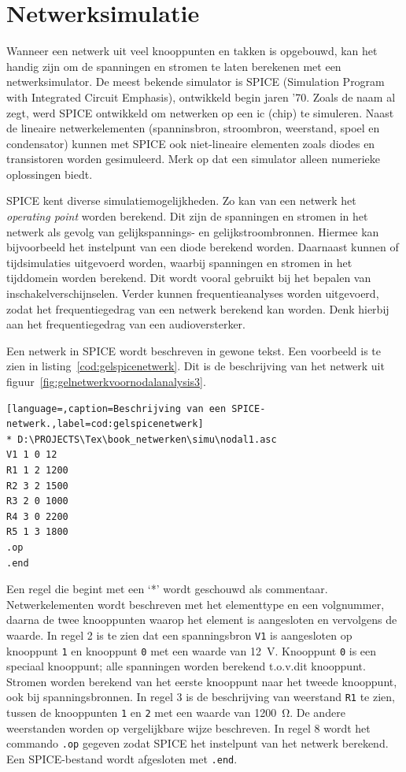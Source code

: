 \section{Netwerksimulatie}
\label{sec:gelsimu}
Wanneer een netwerk uit veel knooppunten en takken is opgebouwd, kan het handig zijn om de spanningen en stromen te laten berekenen met een netwerksimulator. De meest bekende simulator is SPICE (Simulation Program with Integrated Circuit Emphasis), ontwikkeld begin jaren '70. Zoals de naam al zegt, werd SPICE ontwikkeld om netwerken op een ic (chip) te simuleren. Naast de lineaire netwerkelementen (spanninsbron, stroombron, weerstand, spoel en condensator) kunnen met SPICE ook niet-lineaire elementen zoals diodes en transistoren worden gesimuleerd. Merk op dat een simulator alleen numerieke oplossingen biedt.

SPICE kent diverse simulatiemogelijkheden. Zo kan van een netwerk het \textsl{operating point} worden berekend. Dit zijn de spanningen en stromen in het netwerk als gevolg van gelijkspannings- en gelijkstroombronnen. Hiermee kan bijvoorbeeld het instelpunt van een diode berekend worden. Daarnaast kunnen of tijdsimulaties uitgevoerd worden, waarbij spanningen en stromen in het tijddomein worden berekend. Dit wordt vooral gebruikt bij het bepalen van inschakelverschijnselen. Verder kunnen frequentieanalyses worden uitgevoerd, zodat het frequentiegedrag van een netwerk berekend kan worden. Denk hierbij aan het frequentiegedrag van een audioversterker.

Een netwerk in SPICE wordt beschreven in gewone tekst. Een voorbeeld is te zien in listing~\ref{cod:gelspicenetwerk}. Dit is de beschrijving van het netwerk uit figuur~\ref{fig:gelnetwerkvoornodalanalysis3}.

\begin{lstlisting}[language=,caption=Beschrijving van een SPICE-netwerk.,label=cod:gelspicenetwerk]
* D:\PROJECTS\Tex\book_netwerken\simu\nodal1.asc
V1 1 0 12
R1 1 2 1200
R2 3 2 1500
R3 2 0 1000
R4 3 0 2200
R5 1 3 1800
.op
.end
\end{lstlisting}

Een regel die begint met een `*' wordt geschouwd als commentaar. Netwerkelementen wordt beschreven met het elementtype en een volgnummer, daarna de twee knooppunten waarop het element is aangesloten en vervolgens de waarde. In regel 2 is te zien dat een spanningsbron \lstinline|V1| is aangesloten op knooppunt \lstinline|1| en knooppunt \lstinline|0| met een waarde van \SI{12}{\volt}. Knooppunt \lstinline|0| is een speciaal knooppunt; alle spanningen worden berekend t.o.v.\@ dit knooppunt. Stromen worden berekend van het eerste knooppunt naar het tweede knooppunt, ook bij spanningsbronnen. In regel 3 is de beschrijving van weerstand \lstinline|R1| te zien, tussen de knooppunten \lstinline|1| en \lstinline|2| met een waarde van \SI{1200}{\ohm}. De andere weerstanden worden op vergelijkbare wijze beschreven. In regel 8 wordt het commando \lstinline|.op| gegeven zodat SPICE het instelpunt van het netwerk berekend. Een SPICE-bestand wordt afgesloten met \lstinline|.end|.

